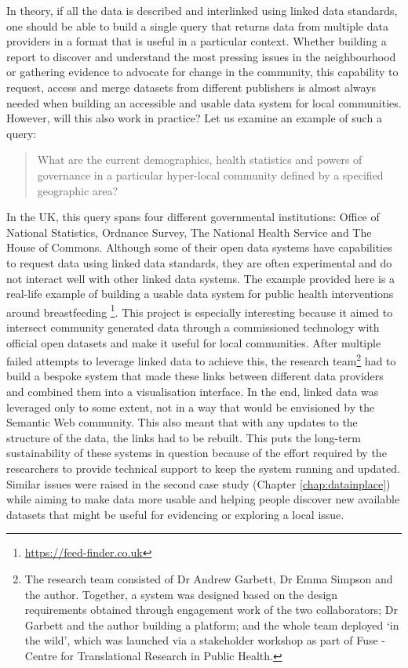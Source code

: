 In theory, if all the data is described and interlinked using linked data standards, one should be able to build a single query that returns data from multiple data providers in a format that is useful in a particular context. Whether building a report to discover and understand the most pressing issues in the neighbourhood or gathering evidence to advocate for change in the community, this capability to request, access and merge datasets from different publishers is almost always needed when building an accessible and usable data system for local communities. However, will this also work in practice?
Let us examine an example of such a query: 
\begin{quote}
    What are the current \colorbox{blue!30}{demographics}, \colorbox{green!30}{health statistics} and \colorbox{orange!30}{powers of governance} in a particular hyper-local community defined by a specified \colorbox{yellow!30}{geographic area}?
\end{quote} 
In the UK, this query spans four different governmental institutions: \colorbox{blue!30}{Office of National Statistics}, \colorbox{yellow!30}{Ordnance Survey}, \colorbox{green!30}{The National Health Service} and \colorbox{orange!30}{The House of Commons}. Although some of their open data systems have capabilities to request data using linked data standards, they are often experimental and do not interact well with other linked data systems. The example provided here is a real-life example of building a usable data system for public health interventions around breastfeeding \footnote{\url{https://feed-finder.co.uk}}. This project is especially interesting because it aimed to intersect community generated data \citep{balaam_feedfinder:_2015} through a commissioned technology \citep{garbett_app_2016} with official open datasets and make it useful for local communities. After multiple failed attempts to leverage linked data to achieve this, the research team\footnote{The research team consisted of Dr Andrew Garbett, Dr Emma Simpson and the author. Together, a system was designed based on the design requirements obtained through engagement work of the two collaborators; Dr Garbett and the author building a platform; and the whole team deployed `in the wild', which was launched via a stakeholder workshop as part of Fuse - Centre for Translational Research in Public Health.} had to build a bespoke system that made these links between different data providers and combined them into a visualisation interface. In the end, linked data was leveraged only to some extent, not in a way that would be envisioned by the Semantic Web community. This also meant that with any updates to the structure of the data, the links had to be rebuilt. This puts the long-term sustainability of these systems in question because of the effort required by the researchers to provide technical support to keep the system running and updated. Similar issues were raised in the second case study (Chapter \ref{chap:datainplace}) while aiming to make data more usable and helping people discover new available datasets that might be useful for evidencing or exploring a local issue.

